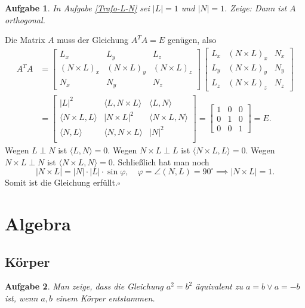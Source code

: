 \documentclass[a4paper,10pt,fleqn,twoside]{scrartcl}
\numberwithin{equation}{section}
\newcommand{\strong}[1]{{\normalfont\sffamily\bfseries #1}}
\renewcommand{\qedsymbol}{\ensuremath{\square}}
\theoremstyle{Aufgabe}
\newtheorem{Aufgabe}{\sffamily Aufgabe}[section]
\begin{document}
\begin{Aufgabe}
In Aufgabe \ref{Trafo-L-N} sei $|L|=1$ und $|N|=1$.
Zeige: Dann ist $A$ orthogonal.
\end{Aufgabe}

\noindent\strong{Lösung.} Die Matrix $A$ muss der
Gleichung $A^T A = E$ genügen, also
\begin{align}
A^T A &= \begin{bmatrix}
L_x & L_y & L_z\\
(N\times L)_x & (N\times L)_y & (N\times L)_z\\
N_x & N_y & N_z
\end{bmatrix}\,
\begin{bmatrix}
L_x & (N\times L)_x & N_x\\
L_y & (N\times L)_y & N_y\\
L_z & (N\times L)_z & N_z
\end{bmatrix}\\
&= \begin{bmatrix}
|L|^2 & \langle L,N\times L\rangle & \langle L,N\rangle\\
\langle N\times L,L\rangle & |N\times L|^2 & \langle N\times L,N\rangle\\
\langle N,L\rangle & \langle N,N\times L\rangle & |N|^2\\
\end{bmatrix}
= \begin{bmatrix}
1 & 0 & 0\\
0 & 1 & 0\\
0 & 0 & 1
\end{bmatrix} = E.
\end{align}
Wegen $L\perp N$ ist $\langle L,N\rangle=0$. Wegen $N\times L\perp L$
ist $\langle N\times L,L\rangle=0$. Wegen $N\times L\perp N$ ist
$\langle N\times L,N\rangle=0$. Schließlich hat man noch
\begin{equation}
|N\times L| = |N|\cdot|L|\cdot\sin \varphi,\quad \varphi=\angle(N,L)=90^\circ\implies |N\times L|=1.
\end{equation}
Somit ist die Gleichung erfüllt.\;\qedsymbol

\newpage
\section{Algebra}
\subsection{Körper}

\begin{Aufgabe}
Man zeige, dass die Gleichung $a^2=b^2$
äquivalent zu $a=b\lor a=-b$ ist, wenn $a,b$ einem Körper
entstammen.
\end{Aufgabe}
\end{document}
